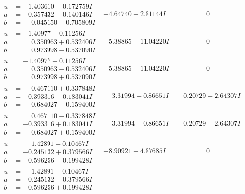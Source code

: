 \documentclass[1p]{elsarticle_modified}
\theoremstyle{definition}
\begin{document}
$$\begin{array}{c|c|c}
\begin{aligned}
u &= -1.403610 - 0.172759 I \\
a &= -0.357432 - 0.140146 I \\
b &= \phantom{-}0.045150 - 0.705809 I\end{aligned}
 & -4.64740 + 2.81144 I & \phantom{-0.000000 } 0 \\ \hline\begin{aligned}
u &= -1.40977 + 0.11256 I \\
a &= \phantom{-}0.350963 + 0.532406 I \\
b &= \phantom{-}0.973998 - 0.537090 I\end{aligned}
 & -5.38865 + 11.04220 I & \phantom{-0.000000 } 0 \\ \hline\begin{aligned}
u &= -1.40977 - 0.11256 I \\
a &= \phantom{-}0.350963 - 0.532406 I \\
b &= \phantom{-}0.973998 + 0.537090 I\end{aligned}
 & -5.38865 - 11.04220 I & \phantom{-0.000000 } 0 \\ \hline\begin{aligned}
u &= \phantom{-}0.467110 + 0.337848 I \\
a &= -0.393316 - 0.183041 I \\
b &= \phantom{-}0.684027 - 0.159400 I\end{aligned}
 & \phantom{-}3.31994 + 0.86651 I & \phantom{-}0.20729 + 2.64307 I \\ \hline\begin{aligned}
u &= \phantom{-}0.467110 - 0.337848 I \\
a &= -0.393316 + 0.183041 I \\
b &= \phantom{-}0.684027 + 0.159400 I\end{aligned}
 & \phantom{-}3.31994 - 0.86651 I & \phantom{-}0.20729 - 2.64307 I \\ \hline\begin{aligned}
u &= \phantom{-}1.42891 + 0.10467 I \\
a &= -0.245132 + 0.379566 I \\
b &= -0.596256 - 0.199428 I\end{aligned}
 & -8.90921 - 4.87685 I & \phantom{-0.000000 } 0 \\ \hline\begin{aligned}
u &= \phantom{-}1.42891 - 0.10467 I \\
a &= -0.245132 - 0.379566 I \\
b &= -0.596256 + 0.199428 I\end{aligned}

\end{array}$$
\end{document}
